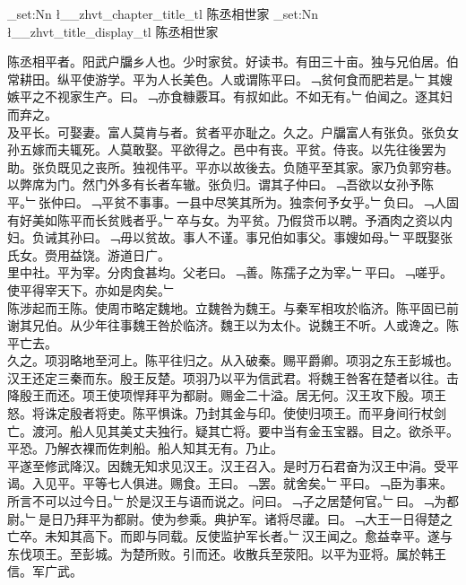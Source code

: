 \documentclass{zhvt-classic}
\begin{document}
\clearpage
\ExplSyntaxOn
\tl_set:Nn \l__zhvt_chapter_title_tl { 陈丞相世家 }
\tl_set:Nn \l__zhvt_title_display_tl { 陈丞相世家 }
\ExplSyntaxOff
\maketitle


\hspace*{2em}陈丞相平者。阳武户牖乡人也。少时家贫。好读书。有田三十亩。独与兄伯居。伯常耕田。纵平使游学。平为人长美色。人或谓陈平曰。﹁贫何食而肥若是。﹂其嫂嫉平之不视家生产。曰。﹁亦食糠覈耳。有叔如此。不如无有。﹂伯闻之。逐其妇而弃之。\\
\hspace*{2em}及平长。可娶妻。富人莫肯与者。贫者平亦耻之。久之。户牖富人有张负。张负女孙五嫁而夫辄死。人莫敢娶。平欲得之。邑中有丧。平贫。侍丧。以先往後罢为助。张负既见之丧所。独视伟平。平亦以故後去。负随平至其家。家乃负郭穷巷。以弊席为门。然门外多有长者车辙。张负归。谓其子仲曰。﹁吾欲以女孙予陈平。﹂张仲曰。﹁平贫不事事。一县中尽笑其所为。独柰何予女乎。﹂负曰。﹁人固有好美如陈平而长贫贱者乎。﹂卒与女。为平贫。乃假贷币以聘。予酒肉之资以内妇。负诫其孙曰。﹁毋以贫故。事人不谨。事兄伯如事父。事嫂如母。﹂平既娶张氏女。赍用益饶。游道日广。\\
\hspace*{2em}里中社。平为宰。分肉食甚均。父老曰。﹁善。陈孺子之为宰。﹂平曰。﹁嗟乎。使平得宰天下。亦如是肉矣。﹂\\
\hspace*{2em}陈涉起而王陈。使周市略定魏地。立魏咎为魏王。与秦军相攻於临济。陈平固已前谢其兄伯。从少年往事魏王咎於临济。魏王以为太仆。说魏王不听。人或谗之。陈平亡去。\\
\hspace*{2em}久之。项羽略地至河上。陈平往归之。从入破秦。赐平爵卿。项羽之东王彭城也。汉王还定三秦而东。殷王反楚。项羽乃以平为信武君。将魏王咎客在楚者以往。击降殷王而还。项王使项悍拜平为都尉。赐金二十溢。居无何。汉王攻下殷。项王怒。将诛定殷者将吏。陈平惧诛。乃封其金与印。使使归项王。而平身间行杖剑亡。渡河。船人见其美丈夫独行。疑其亡将。要中当有金玉宝器。目之。欲杀平。平恐。乃解衣裸而佐刺船。船人知其无有。乃止。\\
\hspace*{2em}平遂至修武降汉。因魏无知求见汉王。汉王召入。是时万石君奋为汉王中涓。受平谒。入见平。平等七人俱进。赐食。王曰。﹁罢。就舍矣。﹂平曰。﹁臣为事来。所言不可以过今日。﹂於是汉王与语而说之。问曰。﹁子之居楚何官。﹂曰。﹁为都尉。﹂是日乃拜平为都尉。使为参乘。典护军。诸将尽讙。曰。﹁大王一日得楚之亡卒。未知其高下。而即与同载。反使监护军长者。﹂汉王闻之。愈益幸平。遂与东伐项王。至彭城。为楚所败。引而还。收散兵至荥阳。以平为亚将。属於韩王信。军广武。\\
\end{document}
